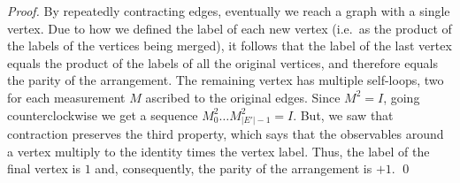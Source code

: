 \documentclass{llncs}
\begin{document}
\begin{proof}
  By repeatedly contracting edges, eventually we reach a graph with a
  single vertex.  Due to how we defined the label of each new vertex
  (i.e.\ as the product of the labels of the vertices being merged),
  it follows that the label of the last vertex equals the product of
  the labels of all the original vertices, and therefore equals the
  parity of the arrangement. The remaining vertex has multiple
  self-loops, two for each measurement \(M\) ascribed to the original
  edges.  Since \(M^{2} = I\), going counterclockwise we get a
  sequence \(M_{0}^{2} \ldots M_{\vert E'\vert -1}^{2} = I\). But, we
  saw that contraction preserves the third property, which says that
  the observables around a vertex multiply to the identity times the
  vertex label. Thus, the label of the final vertex is \(1\) and,
  consequently, the parity of the arrangement is \(+1\). \qed
\end{proof}
\end{document}
